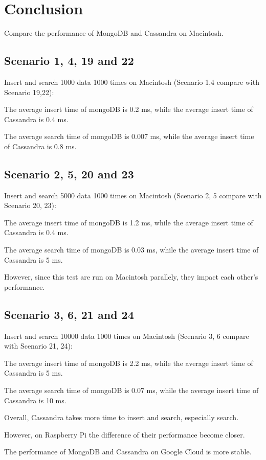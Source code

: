 \section{Conclusion}
Compare the performance of MongoDB and Cassandra on Macintosh. 

\subsection{Scenario 1, 4, 19 and 22}
Insert and search 1000 data 1000 times on Macintosh 
(Scenario 1,4 compare with Scenario 19,22):

The average insert time of mongoDB is 0.2 ms, while the average insert time of 
Cassandra is 0.4 ms.

The average search time of mongoDB is 0.007 ms, while the average
 insert time of Cassandra is 0.8 ms.

\subsection{Scenario 2, 5, 20 and 23}
Insert and search 5000 data 1000 times on Macintosh 
(Scenario 2, 5 compare with Scenario 20, 23):

The average insert time of mongoDB is 1.2 ms, while the average insert time of 
Cassandra is 0.4 ms.

The average search time of mongoDB is 0.03 ms, while the average 
insert time of 
Cassandra is 5 ms.

However, since this test are run on Macintosh parallely, they impact 
each other's 
performance.

\subsection{Scenario 3, 6, 21 and 24}
Insert and search 10000 data 1000 times on Macintosh 
(Scenario 3, 6 compare with Scenario 21, 24):

The average insert time of mongoDB is 2.2 ms, while the average insert time of 
Cassandra is 5 ms.

The average search time of mongoDB is 0.07 ms, while the average insert
 time of 
Cassandra is 10 ms.

Overall, Cassandra takes more time to insert and search, especially search. 

However, on Raspberry Pi the difference of their performance become closer.

The performance of MongoDB and Cassandra on Google Cloud is more stable.



